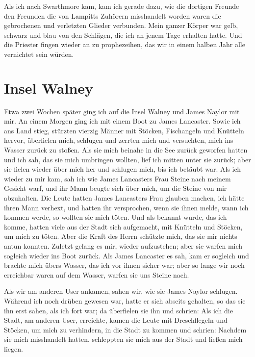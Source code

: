 Als ich nach Swarthmore kam, kam ich gerade
dazu, wie die dortigen Freunde den Freunden die von Lampitts
Zuhörern misshandelt worden waren die gebrochenen und 
verletzten Glieder verbunden. Mein ganzer Körper war gelb, schwarz
und blau von den Schlägen, die ich an jenem Tage erhalten
hatte. Und die Priester fingen wieder an zu prophezeihen, das
wir in einem halben Jahr alle vernichtet sein würden.

\section{Insel Walney}

Etwa zwei Wochen später ging ich auf die 
Insel Walney und
James Naylor mit mir. An einem Morgen 
ging ich mit einem
Boot zu James Lancaster. Sowie 
ich ans Land stieg, stürzten vierzig
Männer mit Stöcken, Fischangeln und Knütteln hervor, überfielen
mich, schlugen und zerrten mich und versuchten, mich ins Wasser zurück
zu stoßen. Als sie mich beinahe in die 
See zurück geworfen hatten
und ich sah, das sie mich umbringen wollten, lief ich mitten unter sie
zurück; aber sie fielen wieder über mich her und schlugen mich,
bis ich betäubt war. Als ich wieder zu mir kam, sah ich wie
James Lancasters Frau Steine nach meinem Gesicht warf, und
ihr Mann beugte sich über mich, um die Steine von mir 
abzuhalten. Die Leute hatten James Lancasters Frau glauben
machen, ich hätte ihren Mann verhext, und hatten ihr 
versprochen, wenn sie ihnen melde, wann ich kommen werde, so
wollten sie mich töten. Und als bekannt wurde, das ich komme,
hatten viele aus der Stadt sich aufgemacht, mit Knütteln und
Stöcken, um mich zu töten. Aber die Kraft des Herrn
schützte mich, das sie mir nichts antun konnten. Zuletzt gelang
es mir, wieder aufzustehen; aber sie warfen mich sogleich wieder
ins Boot zurück. Als James Lancaster es sah, kam er sogleich
und brachte mich übers Wasser, das ich vor ihnen sicher war;
aber so lange wir noch erreichbar waren auf dem Wasser, warfen
sie uns Steine nach. 

Als wir am anderen User ankamen, sahen
wir, wie sie James Naylor schlugen. Während ich noch drüben
gewesen war, hatte er sich abseits gehalten, so das sie ihn erst sahen,
als ich fort war; da überfielen sie ihn und schrien: 
 Als ich die Stadt, am anderen User, erreichte, 
kamen die
Leute mit Dreschflegeln und Stöcken, um mich zu verhindern, in
die Stadt zu kommen und schrien:  Nachdem sie mich misshandelt hatten, schleppten sie
mich aus der Stadt und ließen mich liegen. 

